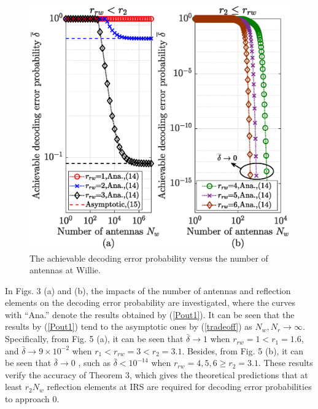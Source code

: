 \documentclass[conference]{IEEEtran}
\begin{document}
\begin{figure}
	\centering
	\includegraphics[width=0.85\linewidth]{figure/fig3_re.eps}
	\caption{The achievable decoding error probability versus the number of antennas at Willie.}
\end{figure}
In Figs. 3 (a) and (b), the impacts of the number of antennas and reflection elements on the decoding error probability are investigated, where the curves with “Ana.” denote the results obtained by (\ref{Pout1}). It can be seen that the results by (\ref{Pout1}) tend to the asymptotic ones by (\ref{tradeoff}) as $N_w,N_r \to \infty$. Specifically, from Fig. 5 (a), it can be seen that $\bar \delta \to 1$ when $r_{rw}=1<r_1=1.6$, and $\bar \delta \to 9\times10^{-2}$ when $r_1<r_{rw}=3<r_2=3.1$. Besides, from Fig. 5 (b), it can be seen that $\bar\delta \to 0$ , such as $\bar\delta<10^{-14}$ when $r_{rw}=4,5,6 \geq r_2=3.1$. These results verify the accuracy of Theorem 3, which gives the theoretical predictions that at least $r_2 N_w$ reflection elements at IRS are required for decoding error probabilities to approach 0.
\end{document}
